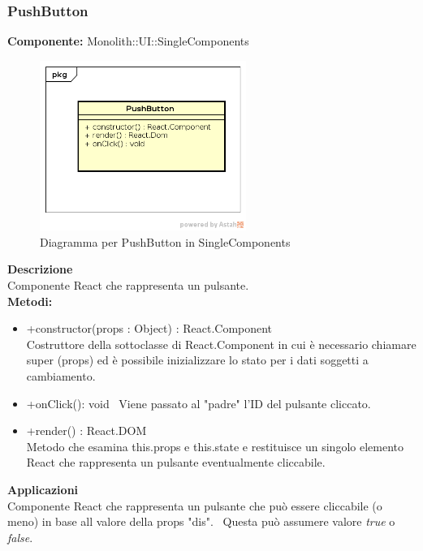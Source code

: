 \subsubsection{PushButton}
\textbf{Componente:}  Monolith::UI::SingleComponents\\
   \FloatBarrier
   \begin{figure}[ht]
   \centering
   \includegraphics[width=0.6\textwidth]{img/single-PushButton}
   \caption{{Diagramma per PushButton in SingleComponents}}
\end{figure}
\FloatBarrier
\textbf{Descrizione}\\
Componente React che rappresenta un pulsante. \\
\textbf{Metodi:} 
\begin{itemize}
\item +constructor(props : Object) : React.Component 
\\
Costruttore della sottoclasse di React.Component in cui è necessario chiamare super (props) ed è possibile inizializzare lo stato per i dati soggetti a cambiamento.

\item +onClick(): void 
\ 
Viene passato al "padre" l'ID del pulsante cliccato.

\item +render() : React.DOM 
\\
Metodo che esamina this.props e this.state e restituisce un singolo elemento React che rappresenta un pulsante eventualmente cliccabile.

\end{itemize} 


\textbf{Applicazioni}\\
Componente React che rappresenta un pulsante che può essere cliccabile (o meno) in base all valore della props "dis". \ Questa può assumere valore \textit{true} o \textit{false}. 


